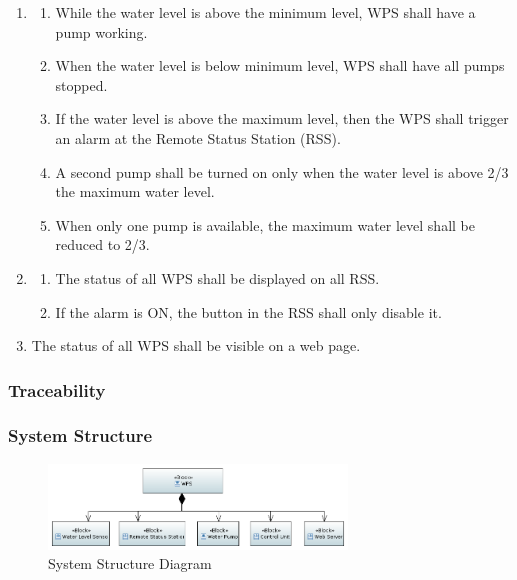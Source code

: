 \documentclass[11pt]{article}
\begin{document}
\begin{enumerate}[leftmargin=4em, font=\small, label=\textbf{SR-\arabic*}]
	\setlength\itemsep{.5em}
	\item 
		\begin{enumerate}[leftmargin=1.5em, font=\small, label=\textbf{.\arabic*:}]
		\setlength\itemsep{0em}
		\item While the water level is above the minimum level, WPS shall have a pump working.
		\item When the water level is below minimum level, WPS shall have all pumps stopped.
		\item If the water level is above the maximum level, then the WPS shall trigger an alarm at the Remote Status Station (RSS).
		\item A second pump shall be turned on only when the water level is above 2/3 the maximum water level.
		\item When only one pump is available, the maximum water level shall be reduced to 2/3.
		\end{enumerate}
	\item
		\begin{enumerate}[leftmargin=1.5em, font=\small, label=\textbf{.\arabic*:}]
		\setlength\itemsep{0em}
		\item The status of all WPS shall be displayed on all RSS.
		\item If the alarm is ON, the button in the RSS shall only disable it.
		\end{enumerate}
	\item The status of all WPS shall be visible on a web page.

\end{enumerate}

\subsubsection{Traceability}


\subsubsection{System Structure}

\begin{figure}[H]
  \centering
  \includegraphics[width=300px]{../diagrams/system-structure.png}
  \caption{System Structure Diagram}
  \label{fig:System Structure Diagram}
\end{figure}
\end{document}
